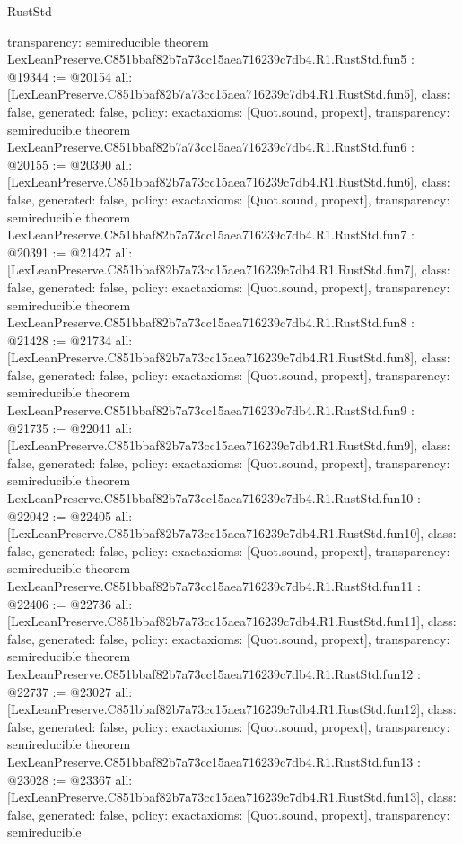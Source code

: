 \begin{lexlean}{RustStd}
\begin{coremodule}
{  transparency: semireducible
}
theorem LexLeanPreserve.C851bbaf82b7a73cc15aea716239c7db4.R1.RustStd.fun5 : @19344 := @20154 {
  all: [LexLeanPreserve.C851bbaf82b7a73cc15aea716239c7db4.R1.RustStd.fun5],
  class: false,
  generated: false,
  policy: exact{axioms: [Quot.sound, propext]},
  transparency: semireducible
}
theorem LexLeanPreserve.C851bbaf82b7a73cc15aea716239c7db4.R1.RustStd.fun6 : @20155 := @20390 {
  all: [LexLeanPreserve.C851bbaf82b7a73cc15aea716239c7db4.R1.RustStd.fun6],
  class: false,
  generated: false,
  policy: exact{axioms: [Quot.sound, propext]},
  transparency: semireducible
}
theorem LexLeanPreserve.C851bbaf82b7a73cc15aea716239c7db4.R1.RustStd.fun7 : @20391 := @21427 {
  all: [LexLeanPreserve.C851bbaf82b7a73cc15aea716239c7db4.R1.RustStd.fun7],
  class: false,
  generated: false,
  policy: exact{axioms: [Quot.sound, propext]},
  transparency: semireducible
}
theorem LexLeanPreserve.C851bbaf82b7a73cc15aea716239c7db4.R1.RustStd.fun8 : @21428 := @21734 {
  all: [LexLeanPreserve.C851bbaf82b7a73cc15aea716239c7db4.R1.RustStd.fun8],
  class: false,
  generated: false,
  policy: exact{axioms: [Quot.sound, propext]},
  transparency: semireducible
}
theorem LexLeanPreserve.C851bbaf82b7a73cc15aea716239c7db4.R1.RustStd.fun9 : @21735 := @22041 {
  all: [LexLeanPreserve.C851bbaf82b7a73cc15aea716239c7db4.R1.RustStd.fun9],
  class: false,
  generated: false,
  policy: exact{axioms: [Quot.sound, propext]},
  transparency: semireducible
}
theorem LexLeanPreserve.C851bbaf82b7a73cc15aea716239c7db4.R1.RustStd.fun10 : @22042 := @22405 {
  all: [LexLeanPreserve.C851bbaf82b7a73cc15aea716239c7db4.R1.RustStd.fun10],
  class: false,
  generated: false,
  policy: exact{axioms: [Quot.sound, propext]},
  transparency: semireducible
}
theorem LexLeanPreserve.C851bbaf82b7a73cc15aea716239c7db4.R1.RustStd.fun11 : @22406 := @22736 {
  all: [LexLeanPreserve.C851bbaf82b7a73cc15aea716239c7db4.R1.RustStd.fun11],
  class: false,
  generated: false,
  policy: exact{axioms: [Quot.sound, propext]},
  transparency: semireducible
}
theorem LexLeanPreserve.C851bbaf82b7a73cc15aea716239c7db4.R1.RustStd.fun12 : @22737 := @23027 {
  all: [LexLeanPreserve.C851bbaf82b7a73cc15aea716239c7db4.R1.RustStd.fun12],
  class: false,
  generated: false,
  policy: exact{axioms: [Quot.sound, propext]},
  transparency: semireducible
}
theorem LexLeanPreserve.C851bbaf82b7a73cc15aea716239c7db4.R1.RustStd.fun13 : @23028 := @23367 {
  all: [LexLeanPreserve.C851bbaf82b7a73cc15aea716239c7db4.R1.RustStd.fun13],
  class: false,
  generated: false,
  policy: exact{axioms: [Quot.sound, propext]},
  transparency: semireducible
}
\end{coremodule}
\end{lexlean}
